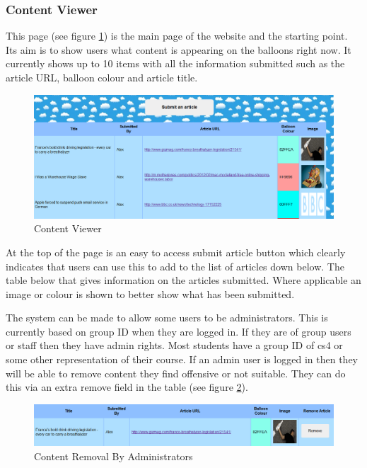 \subsubsection{Content Viewer}
This page (see figure \ref{ContentViewer}) is the main page of the website and the starting point. Its aim is to show users what content is appearing on the balloons right now. It currently shows up to 10 items with all the information submitted such as the article URL, balloon colour and article title.

\begin{figure}
\begin{centering}
\includegraphics[width=\textwidth]{Diagrams/Website-ContentViewer}
\par\end{centering}

\caption{Content Viewer}
\label{ContentViewer}
\end{figure}

At the top of the page is an easy to access submit article button which clearly indicates that users can use this to add to the list of articles down below. The table below that gives information on the articles submitted. Where applicable an image or colour is shown to better show what has been submitted.

The system can be made to allow some users to be administrators. This is currently based on group ID when they are logged in. If they are of group users or staff then they have admin rights. Most students have a group ID of cs4 or some other representation of their course. If an admin user is logged in then they will be able to remove content they find offensive or not suitable. They can do this via an extra remove field in the table (see figure \ref{RemoveContent}).

\begin{figure}
\begin{centering}
\includegraphics[width=\textwidth]{Diagrams/Website-RemoveContent}
\par\end{centering}

\caption{Content Removal By Administrators}
\label{RemoveContent}
\end{figure}

